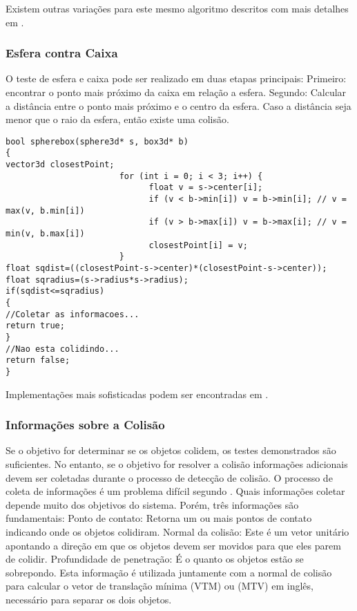 Existem outras variações para este mesmo algoritmo descritos com mais detalhes
em .

\subsubsection{Esfera contra Caixa}

O teste de esfera e caixa pode ser realizado em duas etapas principais:
Primeiro: encontrar o ponto mais próximo da caixa em relação a esfera.
Segundo: Calcular a distância entre o ponto mais próximo e o centro da esfera.
Caso a distância seja menor que o raio da esfera, então existe uma colisão.

\begin{lstlisting}[frame=single,caption=Colisão entre esfera e caixa\label{code:collisionSphereBox}]
bool spherebox(sphere3d* s, box3d* b)
{
vector3d closestPoint;
                       for (int i = 0; i < 3; i++) {
                             float v = s->center[i];
                             if (v < b->min[i]) v = b->min[i]; // v = max(v, b.min[i])
                             if (v > b->max[i]) v = b->max[i]; // v = min(v, b.max[i])
                             closestPoint[i] = v;
                       }
float sqdist=((closestPoint-s->center)*(closestPoint-s->center));
float sqradius=(s->radius*s->radius);
if(sqdist<=sqradius)
{
//Coletar as informacoes...
return true;
}
//Nao esta colidindo...
return false;
}
\end{lstlisting}

Implementações mais sofisticadas podem ser encontradas em .

\subsubsection{Informações sobre a Colisão}

Se o objetivo for determinar  se os objetos colidem, os testes demonstrados são
suficientes. No entanto, se o objetivo for resolver a colisão informações adicionais devem
ser coletadas durante o processo de detecção de colisão. O processo de coleta
de informações é um problema difícil segundo .
Quais informações coletar depende muito dos objetivos do sistema. Porém, três
informações são fundamentais:
Ponto de contato: Retorna um ou mais pontos de contato indicando onde os objetos colidiram.
Normal da colisão: Este é um vetor unitário apontando a direção em que os objetos devem ser movidos para que eles parem de colidir.
Profundidade de penetração: É o quanto os objetos estão se sobrepondo. Esta
informação é utilizada juntamente com a normal de colisão para calcular o vetor
de translação mínima (VTM) ou (MTV) em inglês, necessário para separar os dois
objetos.

